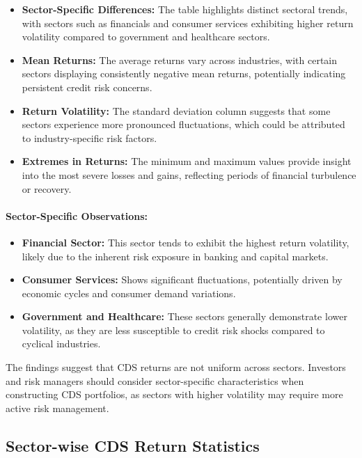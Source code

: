\documentclass{article}
\begin{document}
\begin{itemize}
    \item \textbf{Sector-Specific Differences:} The table highlights distinct sectoral trends, with sectors such as financials and consumer services exhibiting higher return volatility compared to government and healthcare sectors.
    \item \textbf{Mean Returns:} The average returns vary across industries, with certain sectors displaying consistently negative mean returns, potentially indicating persistent credit risk concerns.
    \item \textbf{Return Volatility:} The standard deviation column suggests that some sectors experience more pronounced fluctuations, which could be attributed to industry-specific risk factors.
    \item \textbf{Extremes in Returns:} The minimum and maximum values provide insight into the most severe losses and gains, reflecting periods of financial turbulence or recovery.
\end{itemize}

\paragraph{Sector-Specific Observations:}
\begin{itemize}
    \item \textbf{Financial Sector:} This sector tends to exhibit the highest return volatility, likely due to the inherent risk exposure in banking and capital markets.
    \item \textbf{Consumer Services:} Shows significant fluctuations, potentially driven by economic cycles and consumer demand variations.
    \item \textbf{Government and Healthcare:} These sectors generally demonstrate lower volatility, as they are less susceptible to credit risk shocks compared to cyclical industries.
\end{itemize}

The findings suggest that CDS returns are not uniform across sectors. Investors and risk managers should consider sector-specific characteristics when constructing CDS portfolios, as sectors with higher volatility may require more active risk management.

\subsection{Sector-wise CDS Return Statistics}
\end{document}
